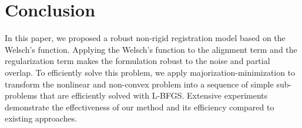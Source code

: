 \section{Conclusion}

In this paper, we proposed a robust non-rigid registration model based on the Welsch's function. Applying the Welsch's function to the alignment term and the regularization term makes the formulation robust to the noise and partial overlap. To efficiently solve this problem, we apply majorization-minimization to transform the nonlinear and non-convex problem into a sequence of simple sub-problems that are efficiently solved with L-BFGS. Extensive experiments demonstrate the effectiveness of our method and its efficiency compared to existing approaches. 